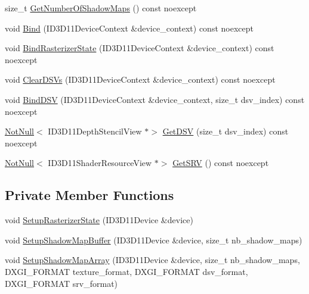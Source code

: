 \begin{DoxyCompactItemize}
\item 
size\+\_\+t \mbox{\hyperlink{classmage_1_1rendering_1_1_shadow_map_buffer_ac0fe3de2d5a4bf147ac2aad969a234aa}{Get\+Number\+Of\+Shadow\+Maps}} () const noexcept
\item 
void \mbox{\hyperlink{classmage_1_1rendering_1_1_shadow_map_buffer_a59fccb2b8261a60c955f81e16d530cda}{Bind}} (I\+D3\+D11\+Device\+Context \&device\+\_\+context) const noexcept
\item 
void \mbox{\hyperlink{classmage_1_1rendering_1_1_shadow_map_buffer_a5216f8d02a3e92a8dcd34dcc6889563c}{Bind\+Rasterizer\+State}} (I\+D3\+D11\+Device\+Context \&device\+\_\+context) const noexcept
\item 
void \mbox{\hyperlink{classmage_1_1rendering_1_1_shadow_map_buffer_a1af9b2bbeaefb1367dbf6c66a2191bcc}{Clear\+D\+S\+Vs}} (I\+D3\+D11\+Device\+Context \&device\+\_\+context) const noexcept
\item 
void \mbox{\hyperlink{classmage_1_1rendering_1_1_shadow_map_buffer_a8aec694d4bc459fefbecb0845c962148}{Bind\+D\+SV}} (I\+D3\+D11\+Device\+Context \&device\+\_\+context, size\+\_\+t dsv\+\_\+index) const noexcept
\item 
\mbox{\hyperlink{namespacemage_a8769f9d670d6b585ea306cb1062af94b}{Not\+Null}}$<$ I\+D3\+D11\+Depth\+Stencil\+View $\ast$$>$ \mbox{\hyperlink{classmage_1_1rendering_1_1_shadow_map_buffer_a3346e66be565ba827d5b4c9b905c4db0}{Get\+D\+SV}} (size\+\_\+t dsv\+\_\+index) const noexcept
\item 
\mbox{\hyperlink{namespacemage_a8769f9d670d6b585ea306cb1062af94b}{Not\+Null}}$<$ I\+D3\+D11\+Shader\+Resource\+View $\ast$$>$ \mbox{\hyperlink{classmage_1_1rendering_1_1_shadow_map_buffer_a22caadf338e87eac69eb9e4297426bf7}{Get\+S\+RV}} () const noexcept
\end{DoxyCompactItemize}
\subsection*{Private Member Functions}
\begin{DoxyCompactItemize}
\item 
void \mbox{\hyperlink{classmage_1_1rendering_1_1_shadow_map_buffer_a04622e03086e5a16783bad043b8754a8}{Setup\+Rasterizer\+State}} (I\+D3\+D11\+Device \&device)
\item 
void \mbox{\hyperlink{classmage_1_1rendering_1_1_shadow_map_buffer_a282239c7ff9ba50246126861d843cf6c}{Setup\+Shadow\+Map\+Buffer}} (I\+D3\+D11\+Device \&device, size\+\_\+t nb\+\_\+shadow\+\_\+maps)
\item 
void \mbox{\hyperlink{classmage_1_1rendering_1_1_shadow_map_buffer_a3efe8318385c4807b1982873afa0e77b}{Setup\+Shadow\+Map\+Array}} (I\+D3\+D11\+Device \&device, size\+\_\+t nb\+\_\+shadow\+\_\+maps, D\+X\+G\+I\+\_\+\+F\+O\+R\+M\+AT texture\+\_\+format, D\+X\+G\+I\+\_\+\+F\+O\+R\+M\+AT dsv\+\_\+format, D\+X\+G\+I\+\_\+\+F\+O\+R\+M\+AT srv\+\_\+format)
\end{DoxyCompactItemize}
